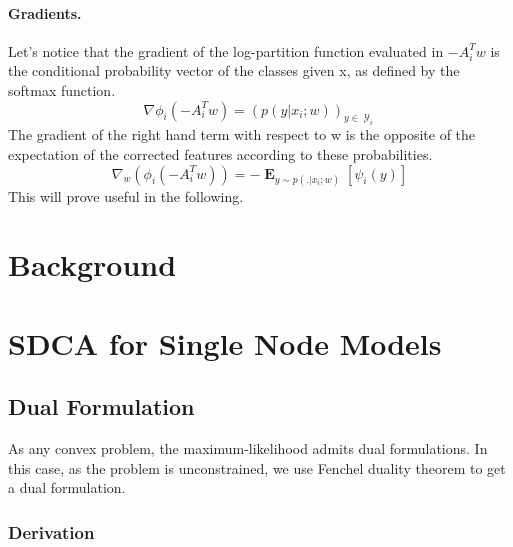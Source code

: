 \documentclass{article}
\DeclareMathOperator{\1}{\mathbb{1}}
\DeclareMathOperator{\E}{\mathbf{E}}
\DeclareMathOperator{\Y}{\mathcal{Y}}
\begin{document}
\paragraph{Gradients.}
Let's notice that the gradient of the log-partition function evaluated in $-A_i^Tw$ is the conditional probability vector of the classes given x, as defined by the softmax function.
\begin{equation}
	\nabla \phi_i(-A_i^Tw) = (p(y | x_i ; w))_{y \in \Y_i}
\end{equation}
The gradient of the right hand term with respect to w is the opposite of the expectation of the corrected features according to these probabilities.
\begin{equation}
	\label{primal gradient}
	\nabla_w (\phi_i(-A_i^Tw)) = - \E_{y \sim p(. | x_i ; w)} [\psi_i(y)]
\end{equation}
This will prove useful in the following.



\section{Background}





\section{SDCA for Single Node Models}

\subsection{Dual Formulation}

As any convex problem, the maximum-likelihood admits dual formulations.
In this case, as the problem is unconstrained, we use Fenchel duality theorem to get a dual formulation.

\subsubsection{Derivation}
\end{document}

